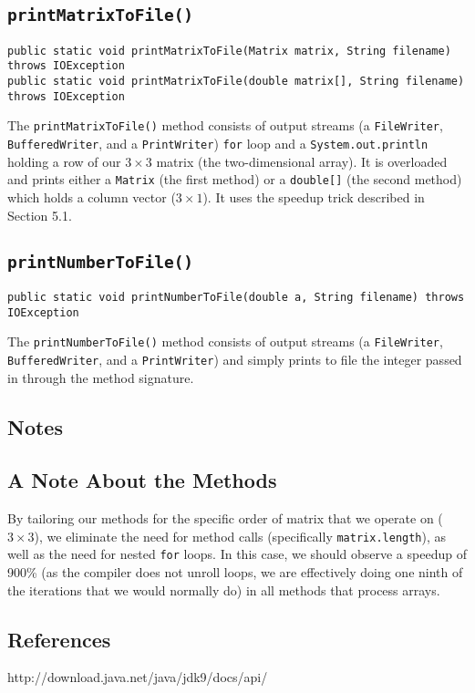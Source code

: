 \documentclass[12pt]{article}
\begin{document}
\subsection{\texttt{printMatrixToFile()}}
\begin{verbatim}
public static void printMatrixToFile(Matrix matrix, String filename) throws IOException 
public static void printMatrixToFile(double matrix[], String filename) throws IOException
\end{verbatim}
The \texttt{printMatrixToFile()} method consists of output streams (a \texttt{FileWriter}, \texttt{BufferedWriter}, and a \texttt{PrintWriter}) \texttt{for} loop and a \texttt{System.out.println} holding a row of our $3\times3$ matrix (the two-dimensional array). It is overloaded and prints either a \texttt{Matrix} (the first method) or a \texttt{double[]} (the second method) which holds a column vector ($3\times1$). It uses the speedup trick described in Section 5.1.

\subsection{\texttt{printNumberToFile()}}
\begin{verbatim}
public static void printNumberToFile(double a, String filename) throws IOException
\end{verbatim}
The \texttt{printNumberToFile()} method consists of output streams (a \texttt{FileWriter}, \texttt{BufferedWriter}, and a \texttt{PrintWriter}) and simply prints to file the integer passed in through the method signature.



\newpage %



\begin{center}
\section{Notes}
\end{center}
\subsection{A Note About the Methods}
By tailoring our methods for the specific order of matrix that we operate on ($3\times3$), we eliminate the need for method calls (specifically \texttt{matrix.length}), as well as the need for nested \texttt{for} loops. In this case, we should observe a speedup of 900\% (as the compiler does not unroll loops, we are effectively doing one ninth of the iterations that we would normally do) in all methods that process arrays.



\newpage %



\begin{center}
\section*{References}
\end{center}
http://download.java.net/java/jdk9/docs/api/
\end{document}
